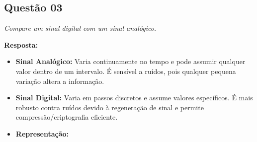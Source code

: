 \subsection*{Questão 03}

\textit{Compare um sinal digital com um sinal analógico.}

\textbf{Resposta:}
\begin{itemize}
    \item \textbf{Sinal Analógico:} Varia continuamente no tempo e pode assumir qualquer valor dentro de um intervalo.
    É sensível a ruídos, pois qualquer pequena variação altera a informação.
    \item \textbf{Sinal Digital:} Varia em passos discretos e assume valores específicos.
    É mais robusto contra ruídos devido à regeneração de sinal e permite compressão/criptografia eficiente.    
    \item \textbf{Representação:}

    \begin{center}
    \end{center}
\end{itemize}
